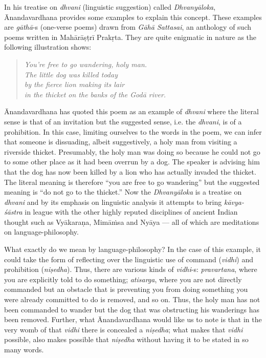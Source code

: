 In his treatise on \textsl{dhvani} (linguistic suggestion) called \textsl{Dhvanyāloka}, Ānandavardhana provides some examples to explain this concept. These examples are \textsl{gāthā}-s (one-verse poems) drawn from \textsl{Gāhā Sattasai}, an anthology of such poems written in Mahārāṣṭrī Prakṛta. They are quite enigmatic in nature as the following illustration shows:

\begin{quote}
\textsl{You’re free to go wandering, holy man.}\\
\textsl{The little dog was killed today}\\
\textsl{by the fierce lion making its lair}\\
\textsl{in the thicket on the banks of the Godā river.}
\end{quote}

Ānandavardhana has quoted this poem as an example of \textsl{dhvani} where the literal sense is that of an invitation but the suggested sense, i.e. the \textsl{dhvani}, is of a prohibition. In this case, limiting ourselves to the words in the poem, we can infer that someone is dissuading, albeit suggestively, a holy man from visiting a riverside thicket. Presumably, the holy man was doing so because he could not go to some other place as it had been overrun by a dog. The speaker is advising him that the dog has now been killed by a lion who has actually invaded the thicket. The literal meaning is therefore ``you are free to go wandering'' but the suggested meaning is ``do not go to the thicket.'' Now the \textsl{Dhvanyāloka} is a treatise on \textsl{dhvani} and by its emphasis on linguistic analysis it attempts to bring \textsl{kāvya-śāstra} in league with the other highly reputed disciplines of ancient Indian thought such as Vyākaraṇa, Mimāṁsa and Nyāya --- all of which are meditations on language-philosophy.

What exactly do we mean by language-philosophy? In the case of this example, it could take the form of reflecting over the linguistic use of command (\textsl{vidhi}) and prohibition (\textsl{niṣedha}). Thus, there are various kinds of \textsl{vidhi}-s: \textsl{pravartana}, where you are explicitly told to do something; \textsl{atisarga}, where you are not directly commanded but an obstacle that is preventing you from doing something you were already committed to do is removed, and so on. Thus, the holy man has not been commanded to wander but the dog that was obstructing his wanderings has been removed. Further, what Ānandavardhana would like us to note is that in the very womb of that \textsl{vidhi} there is concealed a \textsl{niṣedha}; what makes that \textsl{vidhi} possible, also makes possible that \textsl{niṣedha} without having it to be stated in so many words.

